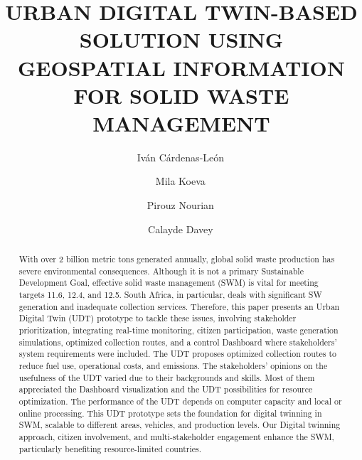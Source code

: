 \documentclass[authoryear,preprint,review,doubleblind, 12pt]{elsarticle}
\begin{document}
    \begin{frontmatter}


    \title{URBAN DIGITAL TWIN-BASED SOLUTION USING  GEOSPATIAL INFORMATION FOR SOLID WASTE MANAGEMENT}

    \author[Utwente]{Iván Cárdenas-León\,}


    \author[Utwente]{Mila Koeva\,}
    \author[Utwente]{Pirouz Nourian\,}
    \author[UPretoria]{Calayde Davey\,}


    \begin{abstract}
    \label{sec:abstract}
    With over 2 billion metric tons generated annually, global solid waste production has severe environmental consequences. Although it is not a primary Sustainable Development Goal, effective solid waste management (SWM) is vital for meeting targets 11.6, 12.4, and 12.5. South Africa, in particular, deals with significant SW generation and inadequate collection services. Therefore, this paper presents an Urban Digital Twin (UDT) prototype to tackle these issues, involving stakeholder prioritization, integrating real-time monitoring, citizen participation, waste generation simulations, optimized collection routes, and a control Dashboard where stakeholders' system requirements were included. The UDT proposes optimized collection routes to reduce fuel use, operational costs, and emissions. The stakeholders' opinions on the usefulness of the UDT varied due to their backgrounds and skills. Most of them appreciated the Dashboard visualization and the UDT possibilities for resource optimization. The performance of the UDT depends on computer capacity and local or online processing. This UDT prototype sets the foundation for digital twinning in SWM, scalable to different areas, vehicles, and production levels. Our Digital twinning approach, citizen involvement, and multi-stakeholder engagement enhance the SWM, particularly benefiting resource-limited countries.
    \end{abstract}


\end{frontmatter}
\end{document}
